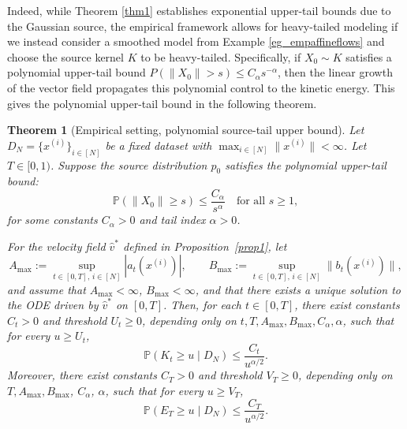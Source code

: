 \documentclass[a4paper,11pt]{article}
\theoremstyle{plain}
\newtheorem{theoreminner}{Theorem}[section]
\theoremstyle{definition}
\newenvironment{theorem}[1][]
  {\begin{mdframed}[style=theoremstyle]\begin{theoreminner}[#1]}
  {\end{theoreminner}\end{mdframed}}
\begin{document}



Indeed, while Theorem \ref{thm1} establishes exponential upper-tail bounds  due to the Gaussian source, the empirical framework allows for heavy-tailed modeling if we instead consider a smoothed model from Example \ref{eg_empaffineflows} and choose the source kernel $K$ to be heavy-tailed. Specifically, if \(X_0\sim K\) satisfies a polynomial upper-tail bound \(P(\|X_0\|>s)\le C_\alpha s^{-\alpha}\), then the linear growth of the vector field propagates this polynomial control to the kinetic energy. This gives the polynomial upper-tail bound in the following theorem. 

\begin{theorem}[Empirical setting, polynomial source-tail upper bound]
\label{thm2_polydecay}
Let $D_N = \{x^{(i)}\}_{i\in[N]}$ be a fixed  dataset with 
$\max_{i\in[N]} \|x^{(i)}\| < \infty$. Let $T \in [0,1)$.
Suppose the source distribution \(p_0\) satisfies the polynomial upper-tail bound:
\[
\mathbb{P}(\|X_0\| \ge s) \le \frac{C_\alpha}{s^\alpha}
\quad\text{for all } s \ge 1,
\]
for some constants $C_\alpha > 0$ and tail index $\alpha > 0$.

For the velocity field $\hat v^\ast$ defined in Proposition~\ref{prop1}, let
\[
A_{\max} := \sup_{t\in[0,T],\,i\in[N]} |a_t(x^{(i)})|,
\qquad
B_{\max} := \sup_{t\in[0,T],\,i\in[N]} \|b_t(x^{(i)})\|,
\]
and assume that \(A_{\max}<\infty\), \(B_{\max}<\infty\), and that there exists a unique solution to the ODE driven by $\hat v^\ast$
on $[0,T]$. Then, for each $t\in[0,T]$, there exist constants $C_t>0$ and threshold $U_t\ge 0$, depending only on $t, T, A_{\max}, B_{\max}, C_\alpha, \alpha$, such that for every $u\ge U_t$,
\[
\mathbb{P}(K_t \ge u \mid D_N) \le \frac{C_t}{u^{\alpha/2}}.
\]
Moreover, there exist constants $C_T>0$ and threshold $V_T\ge 0$, depending only on $T, A_{\max}, B_{\max}$, $C_\alpha$, $\alpha$, such that for every $u\ge V_T$,
\[
\mathbb{P}(E_T \ge u \mid D_N) \le \frac{C_T}{u^{\alpha/2}}.
\]
\end{theorem}
\end{document}
